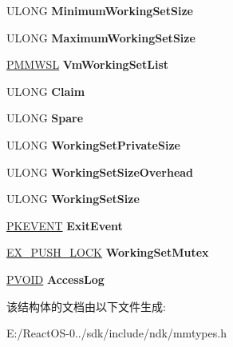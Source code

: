 \begin{DoxyCompactItemize}
U\+L\+O\+NG {\bfseries Minimum\+Working\+Set\+Size}
\item 
\mbox{\label{struct___m_m_s_u_p_p_o_r_t_af85b65932c6db1babea34279434c59c9}} 
U\+L\+O\+NG {\bfseries Maximum\+Working\+Set\+Size}
\item 
\mbox{\label{struct___m_m_s_u_p_p_o_r_t_a30fde4093b964dab3a29bc4be3ec6387}} 
\hyperlink{struct___m_m_w_s_l}{P\+M\+M\+W\+SL} {\bfseries Vm\+Working\+Set\+List}
\item 
\mbox{\label{struct___m_m_s_u_p_p_o_r_t_a5b0fa8f2bc7976e18bcdea5480a918c6}} 
U\+L\+O\+NG {\bfseries Claim}
\item 
\mbox{\label{struct___m_m_s_u_p_p_o_r_t_a6fb7e0931175b5c45adca62ebfd4b0e9}} 
U\+L\+O\+NG {\bfseries Spare}
\item 
\mbox{\label{struct___m_m_s_u_p_p_o_r_t_ac535bbe2aadafdcfbdb92e44b7624a30}} 
U\+L\+O\+NG {\bfseries Working\+Set\+Private\+Size}
\item 
\mbox{\label{struct___m_m_s_u_p_p_o_r_t_ae4c615eef68b255d1a9a06ed56c3fc7e}} 
U\+L\+O\+NG {\bfseries Working\+Set\+Size\+Overhead}
\item 
\mbox{\label{struct___m_m_s_u_p_p_o_r_t_a231ff6061535786817fe505bd3b8a8ee}} 
U\+L\+O\+NG {\bfseries Working\+Set\+Size}
\item 
\mbox{\label{struct___m_m_s_u_p_p_o_r_t_af400f89790f96cdcc7ef3a1a618356ec}} 
\hyperlink{struct___k_e_v_e_n_t}{P\+K\+E\+V\+E\+NT} {\bfseries Exit\+Event}
\item 
\mbox{\label{struct___m_m_s_u_p_p_o_r_t_a4f1140f30576fa65ab2ee7afd8562733}} 
\hyperlink{struct___e_x___p_u_s_h___l_o_c_k}{E\+X\+\_\+\+P\+U\+S\+H\+\_\+\+L\+O\+CK} {\bfseries Working\+Set\+Mutex}
\item 
\mbox{\label{struct___m_m_s_u_p_p_o_r_t_a33dacc81c490e86696a52767274b98e6}} 
\hyperlink{interfacevoid}{P\+V\+O\+ID} {\bfseries Access\+Log}
\end{DoxyCompactItemize}


该结构体的文档由以下文件生成\+:\begin{DoxyCompactItemize}
\item 
E\+:/\+React\+O\+S-\/0../sdk/include/ndk/mmtypes.\+h\end{DoxyCompactItemize}
